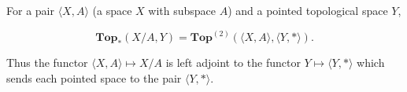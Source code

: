 For a pair $\langle X, A \rangle$ (a space $X$ with subspace $A$) and a pointed topological space $Y$,

$$\mathbf{Top}_* (X/A, Y) = \mathbf{Top}^{(2)} (\langle X, A \rangle, \langle Y, * \rangle).$$

Thus the functor $\langle X, A \rangle \mapsto X/A$ is left adjoint to the functor $Y \mapsto \langle Y, * \rangle$ which sends each pointed space to the pair $\langle Y, * \rangle$.
